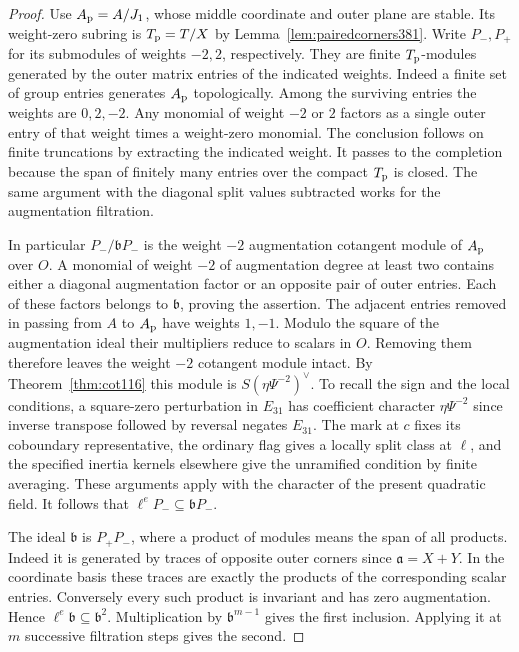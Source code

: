 \documentclass[a4paper,11pt]{article}
\theoremstyle{definition}
\theoremstyle{remark}
\numberwithin{equation}{section}
\begin{document}
\begin{proof}
Use \(A_{\rm p}=A/J_1\), whose middle coordinate and outer plane
are stable. Its weight-zero subring is \(T_{\rm p}=T/X\) by
Lemma~\ref{lem:pairedcorners381}. Write \(P_-,P_+\) for its
submodules of weights \(-2,2\), respectively. They are finite
\(T_{\rm p}\)-modules generated by the outer matrix entries
of the indicated weights. Indeed a finite set of group
entries generates \(A_{\rm p}\) topologically. Among the
surviving entries the weights are \(0,2,-2\). Any monomial of
weight \(-2\) or \(2\) factors as a single outer entry of that
weight times a weight-zero monomial. The conclusion follows
on finite truncations by extracting the indicated weight. It
passes to the completion because the span of finitely many
entries over the compact \(T_{\rm p}\) is closed. The same
argument with the diagonal split values subtracted works for
the augmentation filtration.

In particular \(P_-/\mathfrak bP_-\) is the weight \(-2\)
augmentation cotangent module of \(A_{\rm p}\) over \(O\).
A monomial of weight \(-2\) of augmentation degree at least
two contains either a diagonal augmentation factor or an
opposite pair of outer entries. Each of these factors belongs
to \(\mathfrak b\), proving the assertion. The adjacent entries
removed in passing from \(A\) to \(A_{\rm p}\) have weights
\(1,-1\). Modulo the square of the augmentation ideal their
multipliers reduce to scalars in \(O\). Removing them therefore
leaves the weight \(-2\) cotangent module intact. By
Theorem~\ref{thm:cot116} this module is \(S(\eta\Psi^{-2})^\vee\).
To recall the sign and the local conditions, a square-zero
perturbation in \(E_{31}\) has coefficient character
\(\eta\Psi^{-2}\) since inverse transpose followed by reversal
negates \(E_{31}\). The mark at \(c\) fixes its coboundary
representative, the ordinary flag gives a locally split class
at \(\ell\), and the specified inertia kernels elsewhere give
the unramified condition by finite averaging. These arguments
apply with the character of the present quadratic field.
It follows that \(\ell^e P_-\subseteq\mathfrak bP_-\).

The ideal \(\mathfrak b\) is \(P_+P_-\), where a product of
modules means the span of all products. Indeed it is generated
by traces of opposite outer corners since \(\mathfrak a=X+Y\).
In the coordinate basis these traces are exactly the products
of the corresponding scalar entries. Conversely every such
product is invariant and has zero augmentation. Hence
\(\ell^e\mathfrak b\subseteq\mathfrak b^2\). Multiplication
by \(\mathfrak b^{m-1}\) gives the first inclusion. Applying
it at \(m\) successive filtration steps gives the second.


\end{proof}
\end{document}
